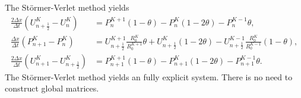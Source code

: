 \documentclass{article}
\begin{document}
The St\"{o}rmer-Verlet method yields
\begin{equation}
	\begin{aligned}
	\frac{2 \Delta x}{\Delta t} \left( U^K_{n+\frac{1}{2}} - U^K_n\right) &= P_n^{K+1} (1-\theta) - P^K_n (1-2\theta) - P^{K-1}_n \theta, \\
	\frac{\Delta x}{\Delta t} \left( P^K_{n+1} - P^K_n\right) &= U^{K+1}_{n+\frac{1}{2}} \frac{R_0^K}{R_0^{K+1}} \theta + U_{n+\frac{1}{2}}^K (1-2\theta) - U^{K-1}_{n+\frac{1}{2}} \frac{R_0^K}{R_0^{K-1}}(1-\theta), \\
	\frac{2 \Delta x}{\Delta t} \left( U^K_{n+1} - U^K_{n+\frac{1}{2}}\right) &= P_{n+1}^{K+1} (1-\theta) - P^K_{n+1} (1-2\theta) - P^{K-1}_{n+1} \theta.
	\end{aligned}
\end{equation}
The St\"{o}rmer-Verlet method yields an fully explicit system. There is no need to construct global matrices. 
\end{document}
